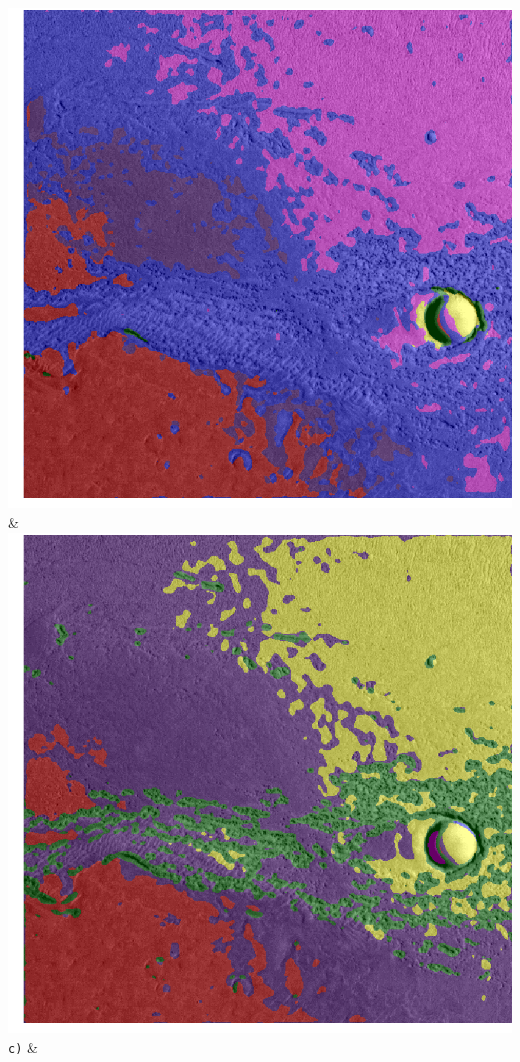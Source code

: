 \begin{table}[h!]
\begin{tabularx}{\textwidth}
		\includegraphics[width=0.9\linewidth]{images/gen/convolution_number/p03_02.png_5.png} &
		\includegraphics[width=0.9\linewidth]{images/gen/convolution_number/p03_02.png_6.png} \\
		\texttt{c)} &

\end{tabularx}
\end{table}
